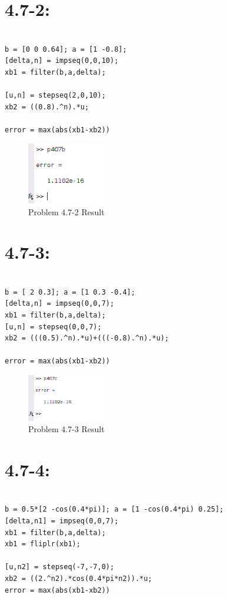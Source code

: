 \documentclass[11pt
  , a4paper
  , article
  , oneside
]{memoir}
\begin{document}
\section{4.7-2: }
\begin{lstlisting}[style=termstyle]
%Problem 4.7-2

b = [0 0 0.64]; a = [1 -0.8]; 
[delta,n] = impseq(0,0,10);
xb1 = filter(b,a,delta);

[u,n] = stepseq(2,0,10); 
xb2 = ((0.8).^n).*u;

error = max(abs(xb1-xb2))
\end{lstlisting}

\begin{figure}[h!]
	\centering
	\includegraphics[width=0.3\textwidth,height=0.1\textwidth]{./images/p407b.png}
	\caption{Problem 4.7-2 Result}
	\label{fig:Problem 4.7-2 Result}
\end{figure}

\section{4.7-3: }
\begin{lstlisting}[style=termstyle]
%Problem 4.7-3

b = [ 2 0.3]; a = [1 0.3 -0.4]; 
[delta,n] = impseq(0,0,7);
xb1 = filter(b,a,delta);
[u,n] = stepseq(0,0,7); 
xb2 = (((0.5).^n).*u)+(((-0.8).^n).*u);

error = max(abs(xb1-xb2))
\end{lstlisting}

\begin{figure}[h!]
	\centering
	\includegraphics[width=0.3\textwidth,height=0.1\textwidth]{./images/p407c.png}
	\caption{Problem 4.7-3 Result}
	\label{fig:Problem 4.7-3 Result}
\end{figure}


\section{4.7-4: }
\begin{lstlisting}[style=termstyle]
%Problme 4.7-4

b = 0.5*[2 -cos(0.4*pi)]; a = [1 -cos(0.4*pi) 0.25];
[delta,n1] = impseq(0,0,7); 
xb1 = filter(b,a,delta); 
xb1 = fliplr(xb1);

[u,n2] = stepseq(-7,-7,0); 
xb2 = ((2.^n2).*cos(0.4*pi*n2)).*u;
error = max(abs(xb1-xb2))
\end{lstlisting}
\end{document}
